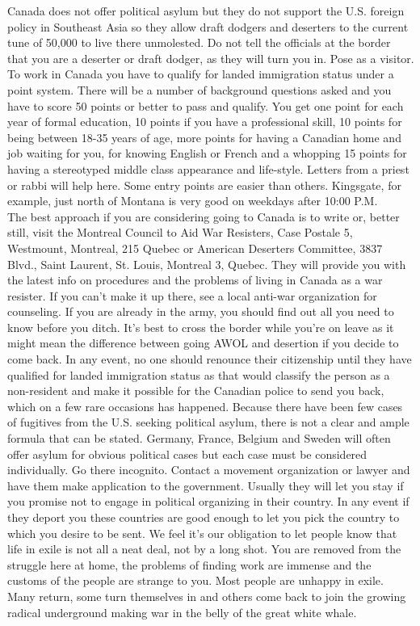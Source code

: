 \documentclass[11pt,twoside,a4paper]{book}
\begin{document}
Canada does not offer political asylum but they do not support the U.S. foreign policy in Southeast Asia so they allow draft dodgers and deserters to the current tune of 50,000 to live there unmolested. Do not tell the officials at the border that you are a deserter or draft dodger, as they will turn you in. Pose as a visitor. To work in Canada you have to qualify for landed immigration status under a point system. There will be a number of background questions asked and you have to score 50 points or better to pass and qualify. You get one point for each year of formal education, 10 points if you have a professional skill, 10 points for being between 18-35 years of age, more points for having a Canadian home and job waiting for you, for knowing English or French and a whopping 15 points for having a stereotyped middle class appearance and life-style. Letters from a priest or rabbi will help here. Some entry points are easier than others. Kingsgate, for example, just north of Montana is very good on weekdays after 10:00 P.M.~\\

The best approach if you are considering going to Canada is to write or, better still, visit the Montreal Council to Aid War Resisters, Case Postale 5, Westmount, Montreal, 215 Quebec or American Deserters Committee, 3837 Blvd., Saint Laurent, St. Louis, Montreal 3, Quebec. They will provide you with the latest info on procedures and the problems of living in Canada as a war resister. If you can't make it up there, see a local anti-war organization for counseling. If you are already in the army, you should find out all you need to know before you ditch. It's best to cross the border while you're on leave as it might mean the difference between going AWOL and desertion if you decide to come back. In any event, no one should renounce their citizenship until they have qualified for landed immigration status as that would classify the person as a non-resident and make it possible for the Canadian police to send you back, which on a few rare occasions has happened. Because there have been few cases of fugitives from the U.S. seeking political asylum, there is not a clear and ample formula that can be stated. Germany, France, Belgium and Sweden will often offer asylum for obvious political cases but each case must be considered individually. Go there incognito. Contact a movement organization or lawyer and have them make application to the government. Usually they will let you stay if you promise not to engage in political organizing in their country. In any event if they deport you these countries are good enough to let you pick the country to which you desire to be sent. We feel it's our obligation to let people know that life in exile is not all a neat deal, not by a long shot. You are removed from the struggle here at home, the problems of finding work are immense and the customs of the people are strange to you. Most people are unhappy in exile. Many return, some turn themselves in and others come back to join the growing radical underground making war in the belly of the great white whale. 
\end{document}
